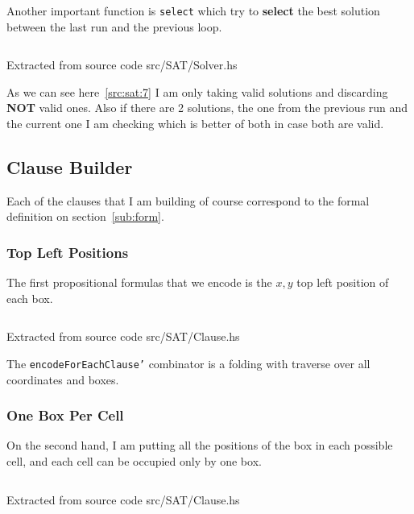 \documentclass[12pt, a4paper]{article}
\begin{document}
Another important function is \texttt{select} which try to \textbf{select} the best solution between the last run and the previous loop.

\begin{listing}[H]
  \inputminted[firstline=55, lastline=74, linenos, breaklines]{haskell}{../src/SAT/Solver.hs}
  \caption{Extracted from source code src/SAT/Solver.hs}
  \label{src:sat:7}
\end{listing}

As we can see here~\ref{src:sat:7} I am only taking valid solutions and discarding \textbf{NOT} valid ones. Also if there are 2 solutions, the one from the previous run and the current one I am checking which is better of both in case both are valid.

\subsection{Clause Builder}\label{sec:clause:builder}

Each of the clauses that I am building of course correspond to the formal definition on section~\ref{sub:form}.

\subsubsection{Top Left Positions}

The first propositional formulas that we encode is the $x, y$ top left position of each box.

\begin{listing}[H]
  \inputminted[firstline=29, lastline=40, linenos, breaklines]{haskell}{../src/SAT/Clause.hs}
  \caption{Extracted from source code src/SAT/Clause.hs}
  \label{src:sat:cl:1}
\end{listing}

The \texttt{encodeForEachClause'} combinator is a folding with traverse over all coordinates and boxes.

\subsubsection{One Box Per Cell}

On the second hand, I am putting all the positions of the box in each possible cell, and each cell can be occupied only by one box.

\begin{listing}[H]
  \inputminted[firstline=43, lastline=53, linenos, breaklines]{haskell}{../src/SAT/Clause.hs}
  \caption{Extracted from source code src/SAT/Clause.hs}
  \label{src:sat:cl:2}
\end{listing}
\end{document}
